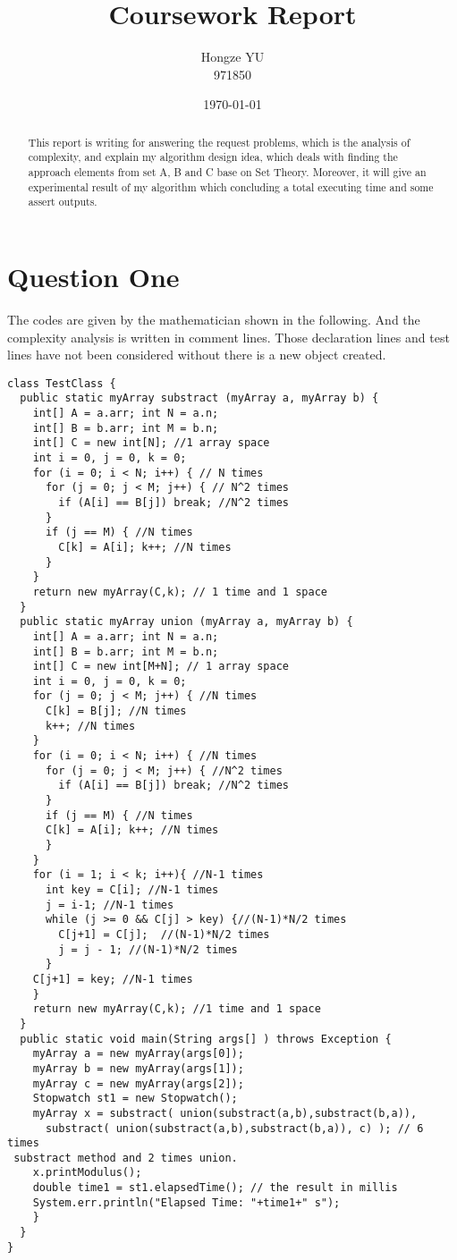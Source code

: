 \documentclass[12pt]{article}
\begin{document}
\title{Coursework Report}

\author{Hongze YU\\ {\small 971850}}
\date{\today}
\maketitle
\begin{abstract}
This report is writing for answering the request problems, which is the analysis of complexity, and explain my algorithm design idea, which deals with finding the approach elements from set A,  B and C base on Set Theory. Moreover, it will give an experimental result of my algorithm which concluding a total executing time and some assert outputs.
\end{abstract}

\tableofcontents \newpage
\section{Question One}
The codes are given by the mathematician shown in the following. And the complexity analysis is written in comment lines. Those declaration lines and test lines have not been considered without there is a new object created.

\begin{verbatim}
class TestClass {
  public static myArray substract (myArray a, myArray b) {
    int[] A = a.arr; int N = a.n;
    int[] B = b.arr; int M = b.n;
    int[] C = new int[N]; //1 array space
    int i = 0, j = 0, k = 0; 
    for (i = 0; i < N; i++) { // N times
      for (j = 0; j < M; j++) { // N^2 times
        if (A[i] == B[j]) break; //N^2 times
      }
      if (j == M) { //N times
        C[k] = A[i]; k++; //N times
      }
    }
    return new myArray(C,k); // 1 time and 1 space
  }
  public static myArray union (myArray a, myArray b) {
    int[] A = a.arr; int N = a.n;
    int[] B = b.arr; int M = b.n;
    int[] C = new int[M+N]; // 1 array space
    int i = 0, j = 0, k = 0;
    for (j = 0; j < M; j++) { //N times
      C[k] = B[j]; //N times
      k++; //N times
    }
    for (i = 0; i < N; i++) { //N times
      for (j = 0; j < M; j++) { //N^2 times
        if (A[i] == B[j]) break; //N^2 times
      }
      if (j == M) { //N times
      C[k] = A[i]; k++; //N times
      }
    }
    for (i = 1; i < k; i++){ //N-1 times
      int key = C[i]; //N-1 times
      j = i-1; //N-1 times
      while (j >= 0 && C[j] > key) {//(N-1)*N/2 times
        C[j+1] = C[j];  //(N-1)*N/2 times
        j = j - 1; //(N-1)*N/2 times
      }
    C[j+1] = key; //N-1 times
    }
    return new myArray(C,k); //1 time and 1 space
  }
  public static void main(String args[] ) throws Exception {
    myArray a = new myArray(args[0]);
    myArray b = new myArray(args[1]);
    myArray c = new myArray(args[2]);
    Stopwatch st1 = new Stopwatch();
    myArray x = substract( union(substract(a,b),substract(b,a)), 
      substract( union(substract(a,b),substract(b,a)), c) ); // 6 times
 substract method and 2 times union.
    x.printModulus();
    double time1 = st1.elapsedTime(); // the result in millis
    System.err.println("Elapsed Time: "+time1+" s");
    }
  }
}
\end{verbatim}
\end{document}
